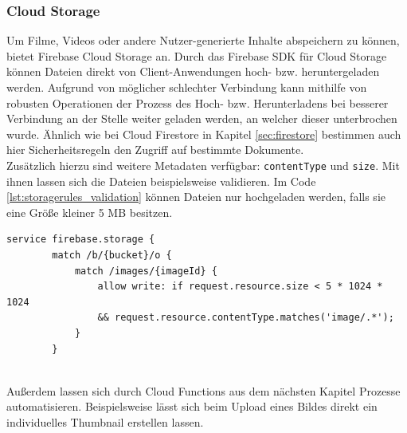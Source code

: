 \subsubsection{Cloud Storage}
Um Filme, Videos oder andere Nutzer-generierte Inhalte abspeichern zu können, bietet Firebase Cloud Storage an. 
Durch das Firebase SDK für Cloud Storage können Dateien direkt von Client-Anwendungen hoch- bzw. heruntergeladen werden.
Aufgrund von möglicher schlechter Verbindung kann mithilfe von robusten Operationen der Prozess des Hoch- bzw. Herunterladens bei besserer Verbindung an der Stelle weiter geladen werden, an welcher dieser unterbrochen wurde.
Ähnlich wie bei Cloud Firestore in Kapitel \ref{sec:firestore} bestimmen auch hier Sicherheitsregeln den Zugriff auf bestimmte Dokumente.\\
Zusätzlich hierzu sind weitere Metadaten verfügbar: \texttt{contentType} und \texttt{size}. 
Mit ihnen lassen sich die Dateien beispielsweise validieren.
Im Code \ref{lst:storagerules_validation} können Dateien nur hochgeladen werden, falls sie eine Größe kleiner 5 MB besitzen.
\medskip
\begin{lstlisting}[caption=Validierung nach Dateigröße, label=lst:storagerules_validation]
	service firebase.storage {
		match /b/{bucket}/o {
			match /images/{imageId} {
				allow write: if request.resource.size < 5 * 1024 * 1024
				&& request.resource.contentType.matches('image/.*');
			}
		}
		
\end{lstlisting}
\medskip
Außerdem lassen sich durch Cloud Functions aus dem nächsten Kapitel Prozesse automatisieren. Beispielsweise lässt sich beim Upload eines Bildes direkt ein individuelles Thumbnail erstellen lassen.\cite{firebase2021}
